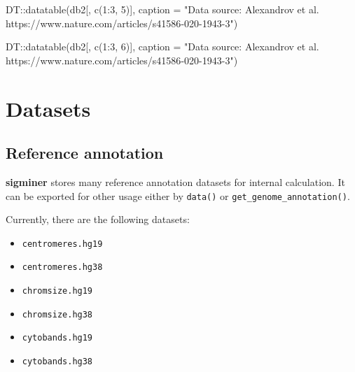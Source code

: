 \documentclass[
  12pt,
  a4paper,
  twoside]{book}
\newenvironment{Shaded}{\begin{snugshade}}{\end{snugshade}}
\newcommand{\AttributeTok}[1]{\textcolor[rgb]{0.77,0.63,0.00}{#1}}
\newcommand{\DecValTok}[1]{\textcolor[rgb]{0.00,0.00,0.81}{#1}}
\newcommand{\FunctionTok}[1]{\textcolor[rgb]{0.00,0.00,0.00}{#1}}
\newcommand{\NormalTok}[1]{#1}
\newcommand{\SpecialCharTok}[1]{\textcolor[rgb]{0.00,0.00,0.00}{#1}}
\newcommand{\StringTok}[1]{\textcolor[rgb]{0.31,0.60,0.02}{#1}}
\providecommand{\tightlist}{%
  \setlength{\itemsep}{0pt}\setlength{\parskip}{0pt}}
\begin{document}
\begin{Shaded}
\begin{Highlighting}[]
\NormalTok{DT}\SpecialCharTok{::}\FunctionTok{datatable}\NormalTok{(db2[, }\FunctionTok{c}\NormalTok{(}\DecValTok{1}\SpecialCharTok{:}\DecValTok{3}\NormalTok{, }\DecValTok{5}\NormalTok{)], }\AttributeTok{caption =} \StringTok{"Data source: Alexandrov et al. https://www.nature.com/articles/s41586{-}020{-}1943{-}3"}\NormalTok{)}
\end{Highlighting}
\end{Shaded}

\begin{Shaded}
\begin{Highlighting}[]
\NormalTok{DT}\SpecialCharTok{::}\FunctionTok{datatable}\NormalTok{(db2[, }\FunctionTok{c}\NormalTok{(}\DecValTok{1}\SpecialCharTok{:}\DecValTok{3}\NormalTok{, }\DecValTok{6}\NormalTok{)], }\AttributeTok{caption =} \StringTok{"Data source: Alexandrov et al. https://www.nature.com/articles/s41586{-}020{-}1943{-}3"}\NormalTok{)}
\end{Highlighting}
\end{Shaded}

\hypertarget{datasets}{%
\chapter{Datasets}\label{datasets}}

\hypertarget{reference-annotation}{%
\section{Reference annotation}\label{reference-annotation}}

\textbf{sigminer} stores many reference annotation datasets for internal calculation. It can be exported for other usage either by \texttt{data()} or \texttt{get\_genome\_annotation()}.

Currently, there are the following datasets:

\begin{itemize}
\tightlist
\item
  \texttt{centromeres.hg19}
\item
  \texttt{centromeres.hg38}
\item
  \texttt{chromsize.hg19}
\item
  \texttt{chromsize.hg38}
\item
  \texttt{cytobands.hg19}
\item
  \texttt{cytobands.hg38}
\end{itemize}
\end{document}
